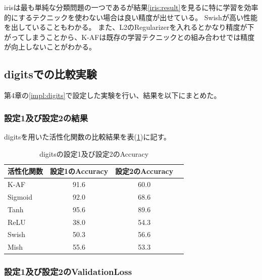 irisは最も単純な分類問題の一つであるが結果\ref{iris:result}を見るに特に学習を効率的にするテクニックを使わない場合は良い精度が出せている。
Swishが高い性能を出していることもわかる。
また、L2のRegularizerを入れるとかなり精度が下がってしまうことから、K-AFは既存の学習テクニックとの組み合わせでは精度が向上しないことがわかる。






\subsection{digitsでの比較実験}
\label{ev:digitsでの比較実験}
第4章の\ref{impl:digits}で設定した実験を行い、結果を以下にまとめた。
\subsubsection{設定1及び設定2の結果}
\label{digits:result}

digitsを用いた活性化関数の比較結果を表(\ref{result:digitstable})に記す。

\begin{table}[htbp]
    \begin{center}
        \caption{digitsの設定1及び設定2のAccuracy}
        \label{result:digitstable}
        \vspace{2mm} 
        \begin{tabular}{l*{2}{c}r}
            活性化関数              & 設定1のAccuracy &  設定2のAccuracy \\
            \hline
            K-AF            & 91.6 & 60.0 \\
            Sigmoid            & 92.0 & 68.6\\
            Tanh            & 95.6 & 89.6 \\
            ReLU        & 38.0 & 54.3 \\
            Swish           & 50.3 & 56.6 \\
            Mish           & 55.6 & 53.3 \\
    
        \end{tabular}
    \end{center}
\end{table}


\subsubsection{設定1及び設定2のValidationLoss}
\label{digits:loss}

